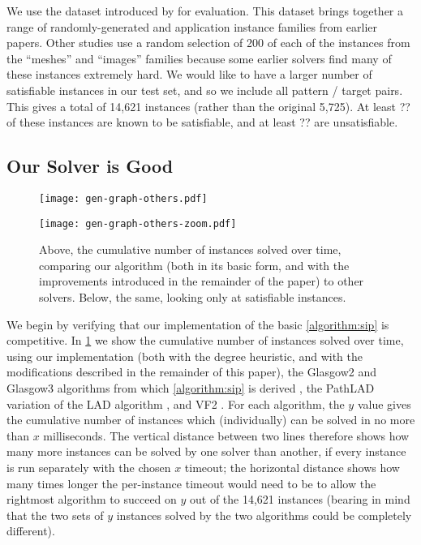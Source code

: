 \documentclass{article}
\newcommand{\citet}[1]{\citeauthor{#1} \shortcite{#1}}
\newcommand{\citep}[1]{\cite{#1}}
\begin{document}
We use the dataset introduced by \citet{DBLP:conf/lion/KotthoffMS16} for evaluation. This dataset
brings together a range of randomly-generated and application instance families from earlier papers.
Other studies use a random selection of 200 of each of the instances from the ``meshes'' and
``images'' families \citep{DBLP:journals/cviu/DamiandSHJS11} because some earlier solvers find many
of these instances extremely hard. We would like to have a larger number of satisfiable instances in
our test set, and so we include all pattern / target pairs. This gives a total of 14,621 instances
(rather than the original 5,725). At least ?? of these instances are known to be satisfiable, and at
least ?? are unsatisfiable.

\subsection{Our Solver is Good}

\begin{figure}[tb]
    \centering
    \texttt{[image: gen-graph-others.pdf]}

    \bigskip

    \centering
    \texttt{[image: gen-graph-others-zoom.pdf]}

    \caption{Above, the cumulative number of instances solved over time, comparing our algorithm
    (both in its basic form, and with the improvements introduced in the remainder of the paper) to
    other solvers. Below, the same, looking only at satisfiable instances.}
    \label{figure:others}
\end{figure}

We begin by verifying that our implementation of the basic \cref{algorithm:sip} is competitive. In
\cref{figure:others} we show the cumulative number of instances solved over time, using our
implementation (both with the degree heuristic, and with the modifications described in the
remainder of this paper), the Glasgow2 and Glasgow3 algorithms from which \cref{algorithm:sip} is derived
\citep{DBLP:conf/cp/McCreeshP15,DBLP:conf/lion/KotthoffMS16}, the PathLAD variation of the LAD
algorithm \citep{DBLP:journals/ai/Solnon10,DBLP:conf/lion/KotthoffMS16}, and VF2
\citep{DBLP:journals/pami/CordellaFSV04}. For each algorithm, the $y$ value
gives the cumulative number of instances which (individually) can be solved in no more than $x$
milliseconds.  The vertical distance between two lines therefore shows how many more instances can
be solved by one solver than another, if every instance is run separately with the chosen $x$
timeout; the horizontal distance shows how many times longer the per-instance timeout would need to
be to allow the rightmost algorithm to succeed on $y$ out of the 14,621 instances (bearing in mind
that the two sets of $y$ instances solved by the two algorithms could be completely different).
\end{document}
